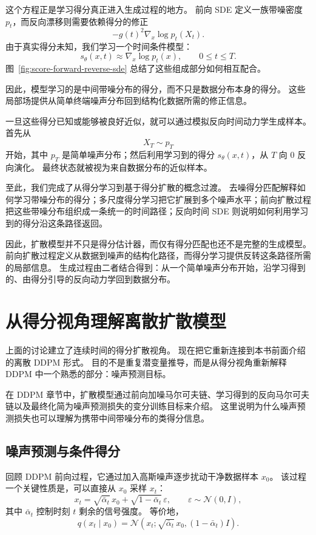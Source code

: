 这个方程正是学习得分真正进入生成过程的地方。
前向 SDE 定义一族带噪密度 $p_t$，而反向漂移则需要依赖得分的修正
\[
-g(t)^2\nabla_x\log p_t(X_t).
\]
由于真实得分未知，我们学习一个时间条件模型：
\[
s_\theta(x,t)
\approx
\nabla_x\log p_t(x),
\qquad
0\leq t\leq T.
\]
图~\ref{fig:score-forward-reverse-sde} 总结了这些组成部分如何相互配合。



因此，模型学习的是中间带噪分布的得分，而不只是数据分布本身的得分。
这些局部场提供从简单终端噪声分布回到结构化数据所需的修正信息。

一旦这些得分已知或能够被良好近似，就可以通过模拟反向时间动力学生成样本。
首先从
\[
X_T\sim p_T
\]
开始，其中 $p_T$ 是简单噪声分布；然后利用学习到的得分 $s_\theta(x,t)$，从 $T$ 向 $0$ 反向演化。
最终状态就被视为来自数据分布的近似样本。

至此，我们完成了从得分学习到基于得分扩散的概念过渡。
去噪得分匹配解释如何学习带噪分布的得分；多尺度得分学习把它扩展到多个噪声水平；前向扩散过程把这些带噪分布组织成一条统一的时间路径；反向时间 SDE 则说明如何利用学习到的得分沿这条路径返回。

因此，扩散模型并不只是得分估计器，而仅有得分匹配也还不是完整的生成模型。
前向扩散过程定义从数据到噪声的结构化路径，而得分学习提供反转这条路径所需的局部信息。
生成过程由二者结合得到：从一个简单噪声分布开始，沿学习得到的、由得分引导的反向动力学回到数据分布。

\section{从得分视角理解离散扩散模型}

上面的讨论建立了连续时间的得分扩散视角。
现在把它重新连接到本书前面介绍的离散 DDPM 形式。
目的不是重复潜变量推导，而是从得分视角重新解释 DDPM 中一个熟悉的部分：噪声预测目标。

在 DDPM 章节中，扩散模型通过前向加噪马尔可夫链、学习得到的反向马尔可夫链以及最终化简为噪声预测损失的变分训练目标来介绍。
这里说明为什么噪声预测损失也可以理解为携带中间带噪分布的类得分信息。

\subsection{噪声预测与条件得分}

回顾 DDPM 前向过程，它通过加入高斯噪声逐步扰动干净数据样本 $x_0$。
该过程一个关键性质是，可以直接从 $x_0$ 采样 $x_t$：
\[
x_t
=
\sqrt{\bar{\alpha}_t}\,x_0
+
\sqrt{1-\bar{\alpha}_t}\,\varepsilon,
\qquad
\varepsilon\sim\mathcal{N}(0,I),
\]
其中 $\bar{\alpha}_t$ 控制时刻 $t$ 剩余的信号强度。
等价地，
\[
q(x_t\mid x_0)
=
\mathcal{N}
\left(
x_t;
\sqrt{\bar{\alpha}_t}\,x_0,
(1-\bar{\alpha}_t)I
\right).
\]

